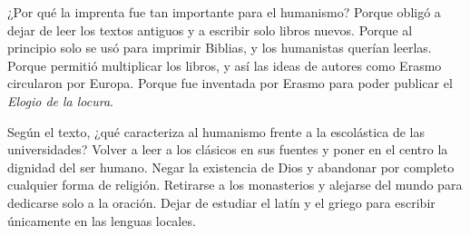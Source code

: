 \documentclass[carta,doscolumnas,compacta]{../plantilla/evaluacion}
\begin{document}
\begin{preguntas}
\begin{pregunta}[C]
¿Por qué la imprenta fue tan importante para el humanismo?
\opcioneslargas
  {Porque obligó a dejar de leer los textos antiguos y a escribir solo libros nuevos.}
  {Porque al principio solo se usó para imprimir Biblias, y los humanistas querían leerlas.}
  {Porque permitió multiplicar los libros, y así las ideas de autores como Erasmo circularon por Europa.}
  {Porque fue inventada por Erasmo para poder publicar el \emph{Elogio de la locura}.}
\end{pregunta}

\begin{pregunta}[A]
Según el texto, ¿qué caracteriza al humanismo frente a la escolástica de las universidades?
\opcioneslargas
  {Volver a leer a los clásicos en sus fuentes y poner en el centro la dignidad del ser humano.}
  {Negar la existencia de Dios y abandonar por completo cualquier forma de religión.}
  {Retirarse a los monasterios y alejarse del mundo para dedicarse solo a la oración.}
  {Dejar de estudiar el latín y el griego para escribir únicamente en las lenguas locales.}
\end{pregunta}


\end{preguntas}
\end{document}
